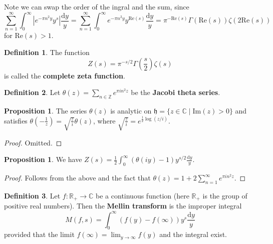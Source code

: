 \documentclass{article}
\theoremstyle{definition}
\newtheorem{prop}[theorem]{Proposition}
\newtheorem{defn}{Definition}[section]
\begin{document}
Note we can swap the order of the ingral and the sum, since \[
\sum_{n=1}^{\infty} \int_{0}^{\infty} \left|e^{-\pi n^2 y}y^s\right|\frac{\mathrm{d}y}{y} = \sum_{n=1}^{\infty} \int_{0}^{\infty} e^{-\pi n^2 y}y^{\text{Re}(s)}\frac{\mathrm{d}y}{y} = \pi^{-\text{Re}(s)}\Gamma(\text{Re}(s))\zeta(2\text{Re}(s))
\]
for $\text{Re}(s)>1$.
\begin{defn}\label{defn2.13}
    The function \[
    Z(s) = \pi^{-s/2}\Gamma \left(\frac{s}{2}\right) \zeta(s)
    \]
    is called the \textbf{complete zeta function}.
\end{defn}
\begin{defn}\label{defn2.14}
    Let $\theta(z) = \sum_{n \in \mathbb{Z}} e^{\pi i n^2 z}$ be the \textbf{Jacobi theta series}.
\end{defn}
\begin{prop}\label{prop2.15}
    The series $\theta(z)$ is analytic on $\mathfrak{h} = \{z \in \mathbb{C} \mid \text{Im}(z)>0\}$ and satisfies $\theta \left(-\frac{1}{z}\right) = \sqrt{\frac{z}{i}}\theta(z)$, where $\sqrt{\frac{z}{i}} = e^{\frac{1}{2}\log(z/i)}$.
\end{prop}
\begin{proof}
    Omitted.
\end{proof}
\begin{prop}\label{prop2.16}
    We have $Z(s) = \frac{1}{2}\int_{0}^{\infty} \left(\theta(iy)-1\right) y^{s/2} \frac{\mathrm{d}y}{y}$.
\end{prop}
\begin{proof}
    Follows from the above and the fact that $\theta(z) = 1 + 2 \sum_{n=1}^{\infty} e^{\pi i n^2 z}$.
\end{proof}
\begin{defn}\label{defn2.17}
    Let $f : \mathbb{R}_+ \to \mathbb{C}$ be a continuous function (here $\mathbb{R}_+$ is the group of positive real numbers). Then the \textbf{Mellin transform} is the improper integral \[
    M(f,s) = \int_{0}^{\infty} (f(y)-f(\infty))y^s \frac{\mathrm{d}y}{y} 
    \]
    provided that the limit $f(\infty) = \lim_{y \to \infty}f(y)$ and the integral exist.
\end{defn}
\end{document}
